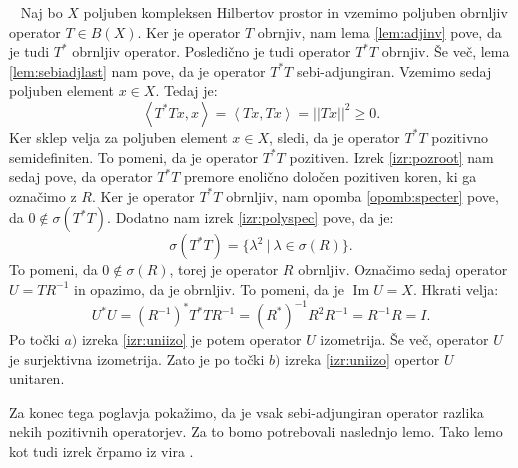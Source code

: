 \documentclass[12pt,a4paper,oneside,fleqn,openany]{book}
\newcommand{\eopf}{\raisebox{0.8ex}{\framebox{}}} %
\newenvironment{dokaz}%
{\noindent{\bf Dokaz.}\ }%
{\hfill\eopf\par\bigskip}%
\newcommand{\abs}[1]{\ensuremath{\lvert #1 \rvert}}
\newcommand{\norm}[1]{\abs{\abs{#1}}}
\newcommand{\Sp}[2]{\ensuremath{\left<#1, #2\right>}}
\begin{document}
\begin{dokaz}
	Naj bo $X$ poljuben kompleksen Hilbertov prostor in vzemimo poljuben obrnljiv operator $T\in B(X)$. Ker je operator $T$ obrnjiv, nam lema \ref{lem:adjinv} pove, da je tudi $T^*$ obrnljiv operator. Posledično je tudi operator $T^*T$ obrnjiv. Še več, lema \ref{lem:sebiadjlast} nam pove, da je operator $T^*T$ sebi-adjungiran. Vzemimo sedaj poljuben element $x\in X$. Tedaj je: $$\Sp{T^*Tx}{x} = \Sp{Tx}{Tx} = \norm{Tx}^2 \geq 0.$$ Ker sklep velja za poljuben element $x\in X$, sledi, da je operator $T^*T$ pozitivno semidefiniten. To pomeni, da je operator $T^*T$ pozitiven. Izrek \ref{izr:pozroot} nam sedaj pove, da operator $T^*T$ premore enolično določen pozitiven koren, ki ga označimo z $R$. Ker je operator $T^*T$ obrnljiv, nam opomba \ref{opomb:specter} pove, da $0\notin\sigma(T^*T)$. Dodatno nam izrek \ref{izr:polyspec} pove, da je: $$\sigma(T^*T) = \{\lambda^2~|~\lambda\in\sigma(R)\}.$$ To pomeni, da $0\notin\sigma(R)$, torej je operator $R$ obrnljiv. Označimo sedaj operator $U = TR^{-1}$ in opazimo, da je obrnljiv. To pomeni, da je $\operatorname{Im}U = X$. Hkrati velja: $$U^*U = (R^{-1})^*T^*TR^{-1} = (R^*)^{-1}R^2R^{-1}= R^{-1}R = I.$$ Po točki $a)$ izreka \ref{izr:uniizo} je potem operator $U$ izometrija. Še več, operator $U$ je surjektivna izometrija. Zato je po točki $b)$ izreka \ref{izr:uniizo} opertor $U$ unitaren. 
\end{dokaz}

Za konec tega poglavja pokažimo, da je vsak sebi-adjungiran operator razlika nekih pozitivnih operatorjev. Za to bomo potrebovali naslednjo lemo. Tako lemo kot tudi izrek črpamo iz vira \cite{bib:Kurepa}.
\end{document}
